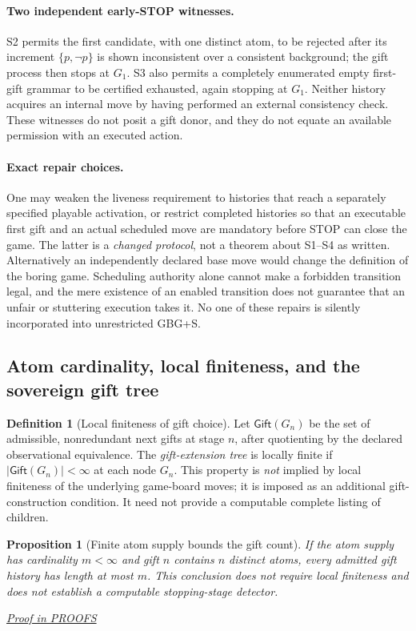 \documentclass[11pt,letterpaper]{article}
\newtheorem{proposition}[theorem]{Proposition}
\theoremstyle{definition}\newtheorem{definition}[theorem]{Definition}\newtheorem{example}[theorem]{Example}
\theoremstyle{remark}\newtheorem{remark}[theorem]{Remark}
\newcommand{\Gift}{\mathsf{Gift}}
\newcommand{\proofat}[1]{\par\smallskip\noindent\hfill\textit{\hyperref[#1]{Proof in PROOFS}}}
\begin{document}
\paragraph{Two independent early-STOP witnesses.}
S2 permits the first candidate, with one distinct atom, to be rejected after
its increment $\{p,\neg p\}$ is shown inconsistent over a consistent
background; the gift process then stops at $G_1$. S3 also permits a
completely enumerated empty first-gift grammar to be certified exhausted,
again stopping at $G_1$. Neither history acquires an internal move by having
performed an external consistency check. These witnesses do not posit a gift
donor, and they do not equate an available permission with an executed action.

\paragraph{Exact repair choices.}
One may weaken the liveness requirement to histories that reach a separately
specified playable activation, or restrict completed histories so that an
executable first gift and an actual scheduled move are mandatory before STOP
can close the game. The latter is a \emph{changed protocol}, not a theorem
about S1--S4 as written. Alternatively an independently declared base move
would change the definition of the boring game. Scheduling authority alone
cannot make a forbidden transition legal, and the mere existence of an enabled
transition does not guarantee that an unfair or stuttering execution takes it.
No one of these repairs is silently incorporated into unrestricted GBG+S.

\subsection{Atom cardinality, local finiteness, and the sovereign gift tree}
\begin{definition}[Local finiteness of gift choice]\label{w0:def:localfinite}
Let $\Gift(G_n)$ be the set of admissible, nonredundant next gifts at stage $n$, after quotienting by the declared observational equivalence. The \emph{gift-extension tree} is locally finite if $|\Gift(G_n)|<\infty$ at each node $G_n$. This property is \emph{not} implied by local finiteness of the underlying game-board moves; it is imposed as an additional gift-construction condition. It need not provide a computable complete listing of children.
\end{definition}

\begin{proposition}[Finite atom supply bounds the gift count]\label{w0:prop:atom-bound}
If the atom supply has cardinality $m<\infty$ and gift $n$ contains $n$ \emph{distinct} atoms, every admitted gift history has length at most $m$. This conclusion does not require local finiteness and does not establish a computable stopping-stage detector.\proofat{w0:pr:atom-bound}
\end{proposition}
\end{document}
